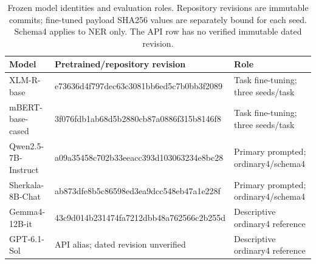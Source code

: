 \begin{table}[t]
\caption{Frozen model identities and evaluation roles. Repository revisions are immutable commits; fine-tuned payload SHA256 values are separately bound for each seed. Schema4 applies to NER only. The API row has no verified immutable dated revision.}
\label{tab:models}
\centering\footnotesize
\begin{tabular}{@{}p{37mm}p{72mm}p{56mm}@{}}
\toprule
Model & Pretrained/repository revision & Role\\
\midrule
XLM-R-base & \textnormal{e73636d4f797dec63c3081bb6ed5c7b0bb3f2089} & Task fine-tuning; three seeds/task\\
mBERT-base-cased & \textnormal{3f076fdb1ab68d5b2880cb87a0886f315b8146f8} & Task fine-tuning; three seeds/task\\
Qwen2.5-7B-Instruct & \textnormal{a09a35458c702b33eeacc393d103063234e8bc28} & Primary prompted; ordinary4/schema4\\
Sherkala-8B-Chat & \textnormal{ab873dfe8b5c86598ed3ea9dcc548eb47a1e228f} & Primary prompted; ordinary4/schema4\\
Gemma4-12B-it & \textnormal{43c9d014b231474fa7212dbb48a762566c2b255d} & Descriptive ordinary4 reference\\
GPT-6.1-Sol & API alias; dated revision unverified & Descriptive ordinary4 reference\\
\bottomrule
\end{tabular}
\end{table}
